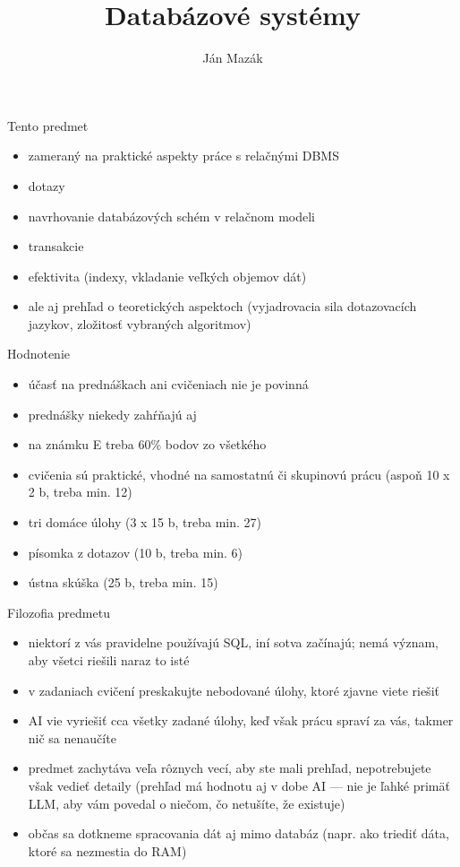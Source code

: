 \documentclass[12pt]{beamer}
\title{Databázové systémy}
\author{Ján Mazák}
\institute{FMFI UK Bratislava}
\date{}
\begin{document}
\frame{\titlepage}

\begin{frame}{Tento predmet}
\begin{itemize}
\item zameraný na praktické aspekty práce s relačnými DBMS
\item dotazy
\item navrhovanie databázových schém v relačnom modeli
\item transakcie
\item efektivita (indexy, vkladanie veľkých objemov dát)
\pause
\item ale aj prehľad o teoretických aspektoch (vyjadrovacia sila dotazovacích jazykov, zložitosť vybraných algoritmov)
\end{itemize}
\end{frame}

\begin{frame}{Hodnotenie}
\begin{itemize}
\item účasť na prednáškach ani cvičeniach nie je povinná
\item prednášky niekedy zahŕňajú aj 
\pause
\item na známku E treba 60\% bodov zo všetkého
\item cvičenia sú praktické, vhodné na samostatnú či skupinovú prácu
    (aspoň 10 x 2 b, treba min. 12)
\item tri domáce úlohy (3 x 15 b, treba min. 27)
\item písomka z dotazov (10 b, treba min. 6)
\item ústna skúška (25 b, treba min. 15)
\end{itemize}
\end{frame}

\begin{frame}{Filozofia predmetu}
\begin{itemize}
\item niektorí z vás pravidelne používajú SQL, iní sotva začínajú; nemá význam, aby všetci riešili naraz to isté
\item v zadaniach cvičení preskakujte nebodované úlohy, ktoré zjavne viete riešiť
\item AI vie vyriešiť cca všetky zadané úlohy, keď však prácu spraví za vás, takmer nič sa nenaučíte
\item predmet zachytáva veľa rôznych vecí, aby ste mali prehľad, nepotrebujete však vedieť detaily
    (prehľad má hodnotu aj v dobe AI --- nie je ľahké primäť LLM, aby vám povedal o niečom, čo netušíte, že existuje)
\item občas sa dotkneme spracovania dát aj mimo databáz (napr. ako triediť dáta, ktoré sa nezmestia do RAM)
\end{itemize}
\end{frame}
\end{document}
